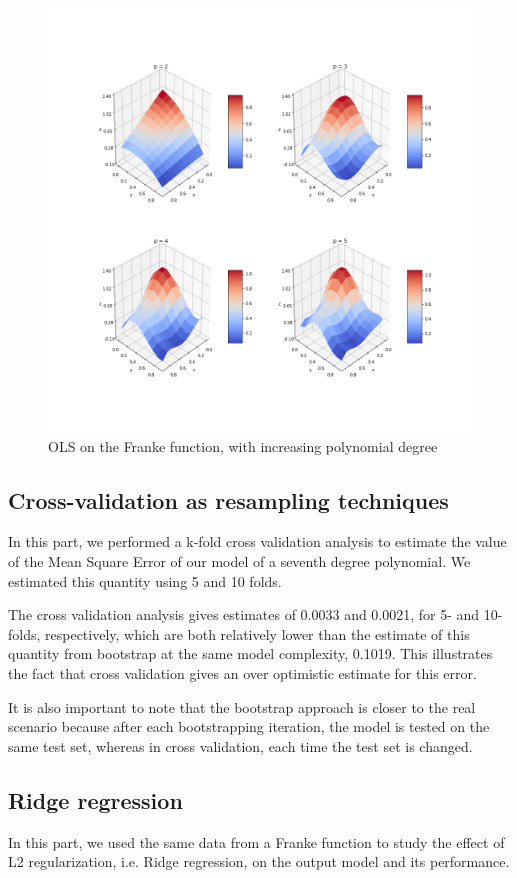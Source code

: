 \documentclass{article}
\begin{document}
\begin{figure}
\includegraphics[scale=0.35]{frankePlots.png}
\caption{OLS on the Franke function, with increasing polynomial degree}
\end{figure}

\subsection{Cross-validation as resampling techniques}
In this part, we performed a k-fold cross validation analysis to estimate the value of the Mean Square Error of our model of a seventh degree polynomial. We estimated this quantity using 5 and 10 folds.

The cross validation analysis gives estimates of 0.0033 and 0.0021, for 5- and 10-folds, respectively, which are both relatively lower than the estimate of this quantity from bootstrap at the same model complexity, 0.1019. This illustrates the fact that cross validation gives an over optimistic estimate for this error.

It is also important to note that the bootstrap approach is closer to the real scenario because after each bootstrapping iteration, the model is tested on the same test set, whereas in cross validation, each time the test set is changed.


\subsection{Ridge regression}
In this part, we used the same data from a Franke function to study the effect of L2 regularization, i.e. Ridge regression, on the output model and its performance.
\end{document}
